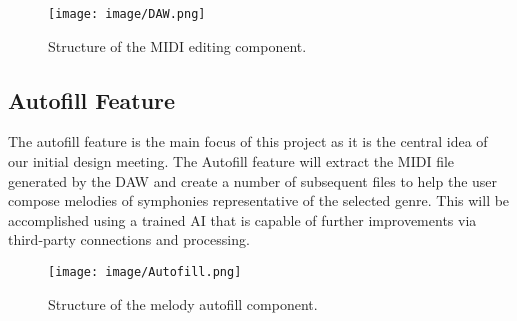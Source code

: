 \begin{figure}[h!]
  \centering
  \texttt{[image: image/DAW.png]}
  \caption{Structure of the MIDI editing component.}
  \label{fig:daw_diagram}
\end{figure}

\newpage
\subsection{Autofill Feature}

The autofill feature is the main focus of this project as it is the central idea of our
initial design meeting. The Autofill feature will extract the MIDI file generated by the
DAW and create a number of subsequent files to help the user compose melodies of
symphonies representative of the selected genre. This will be accomplished using a trained
AI that is capable of further improvements via third-party connections and processing.

\begin{figure}[h!]
  \centering
  \texttt{[image: image/Autofill.png]}
  \caption{Structure of the melody autofill component.}
  \label{fig:autofill_diagram}
\end{figure}
\clearpage
